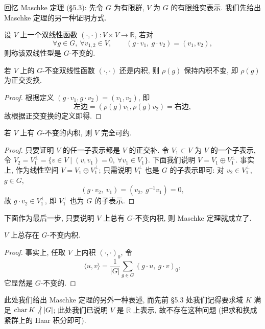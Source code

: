 回忆 Maschke 定理 (\S 5.3): 先令 $G$ 为有限群, $V$ 为 $G$ 的有限维实表示.
我们先给出 Maschke 定理的另一种证明方式.

\begin{definition}[$G$-不变双线性型]\label{def:G-invariant-form}
设 $V$ 上一个双线性函数 $(\cdot,\cdot)\colon V\times V\to\mathbb{R}$, 若对
\[
  \forall g\in G,\ \forall v_{1,2}\in V,\qquad (g\cdot v_1,\ g\cdot v_2)=(v_1,v_2),
\]
则称该双线性型是 $G$-不变的.
\end{definition}

\begin{lemma}\label{lem:invariant-form-orthogonal}
若 $V$ 上的 $G$-不变双线性函数 $(\cdot,\cdot)$ 还是内积, 则 $\rho(g)$ 保持内积不变,
即 $\rho(g)$ 为正交变换.
\end{lemma}

\begin{proof}
根据定义 $(g\cdot v_1,g\cdot v_2)=(v_1,v_2)$, 即
\[
  \text{左边}=(\rho(g)v_1,\rho(g)v_2)=\text{右边},
\]
故根据正交变换的定义即得.
\end{proof}

\begin{theorem}\label{thm:invariant-inner-product}
若 $V$ 上有 $G$-不变的内积, 则 $V$ 完全可约.
\end{theorem}

\begin{proof}
只要证明 $V$ 的任一子表示都是 $V$ 的正交补. 令 $V_1\subset V$ 为 $V$ 的一个子表示,
令 $V_2=V_1^{\perp}=\{v\in V\mid(v,v_1)=0,\ \forall v_1\in V_1\}$.
下面我们说明 $V=V_1\oplus V_1^{\perp}$. 事实上, 作为线性空间 $V=V_1\oplus V_1^{\perp}$;
只需说明 $V_1^{\perp}$ 也是 $G$ 的子表示即可: 对 $v_2\in V_1^{\perp}$, $g\in G$,
\[
  (g\cdot v_2,\ v_1)=(v_2,\ g^{-1}v_1)=0,
\]
故 $g\cdot v_2\in V_1^{\perp}$, 即 $V_1^{\perp}$ 也为 $G$ 的子表示.
\end{proof}

下面作为最后一步, 只要说明 $V$ 上总有 $G$-不变内积, 则 Maschke 定理就成立了.

\begin{proposition}\label{prop:averaged-inner-product}
$V$ 上总存在 $G$-不变内积.
\end{proposition}

\begin{proof}
事实上, 任取 $V$ 上内积 $(\cdot,\cdot)_0$, 令
\[
  \langle u,v\rangle=\frac{1}{|G|}\sum_{g\in G}(g\cdot u,\ g\cdot v)_0,
\]
它显然是 $G$-不变的.
\end{proof}

此处我们给出 Maschke 定理的另外一种表述, 而先前 \S 5.3 处我们记得要求域 $K$ 满足
$\operatorname{char}K\mathrel{\not\big|}|G|$; 此处我们已说明 $V$ 是 $\mathbb{R}$ 上表示,
故不存在这种问题 (把求和换成紧群上的 Haar 积分即可).

